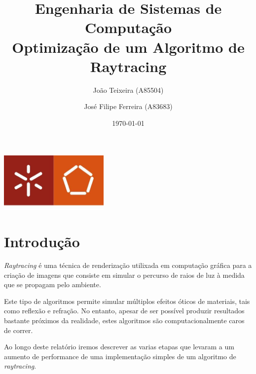 \documentclass[a4paper]{report}
\begin{document}
\title{Engenharia de Sistemas de Computação\\Optimização de um Algoritmo de Raytracing}
\author{João Teixeira (A85504) \and José Filipe Ferreira (A83683)}
\date{\today}

\begin{center}
    \begin{minipage}{0.75\linewidth}
        \centering
        \includegraphics[width=0.4\textwidth]{images/eng.jpeg}\par\vspace{1cm}
        \vspace{1.5cm}
        \href{https://www.uminho.pt/PT}
        {\color{black}{\scshape\LARGE Universidade do Minho}} \par
        \vspace{1cm}
        \href{https://www.di.uminho.pt/}
        {\color{black}{\scshape\Large Departamento de Informática}} \par
        \vspace{1.5cm}
        \maketitle
    \end{minipage}
\end{center}

\tableofcontents

\pagebreak

\chapter{Introdução}
\textit{Raytracing} é uma técnica de renderização utilixada em computação
gráfica para a criação de imagens que consiste em simular o percurso de raios de
luz à medida que se propagam pelo ambiente.

Este tipo de algoritmos permite simular múltiplos efeitos óticos de materiais,
tais como reflexão e refração. No entanto, apesar de ser possível produzir
resultados bastante próximos da realidade, estes algoritmos são
computacionalmente caros de correr.

Ao longo deste relatório iremos descrever as varias etapas que levaram a um
aumento de performance de uma implementação simples de um algoritmo de
\textit{raytracing}.
\end{document}
